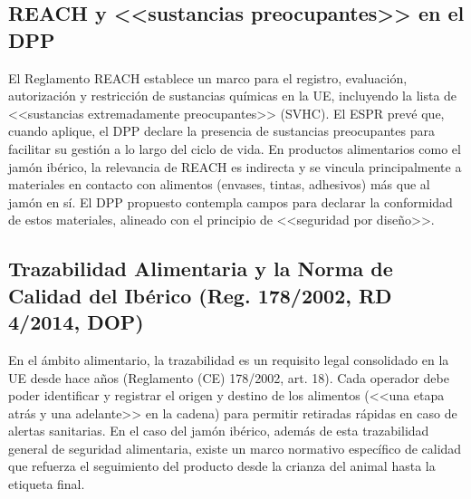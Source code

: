 \subsection{REACH y <<sustancias preocupantes>> en el DPP}\label{sec:marco-reach}
El Reglamento REACH establece un marco para el registro, evaluación, autorización y restricción de sustancias químicas en la UE, incluyendo la lista de <<sustancias extremadamente preocupantes>> (SVHC). %
El ESPR prevé que, cuando aplique, el DPP declare la presencia de sustancias preocupantes para facilitar su gestión a lo largo del ciclo de vida. %
En productos alimentarios como el jamón ibérico, la relevancia de REACH es indirecta y se vincula principalmente a materiales en contacto con alimentos (envases, tintas, adhesivos) más que al jamón en sí. El DPP propuesto contempla campos para declarar la conformidad de estos materiales, alineado con el principio de <<seguridad por diseño>>.

\subsection{Trazabilidad Alimentaria y la Norma de Calidad del Ibérico (Reg. 178/2002, RD 4/2014, DOP)}\label{sec:marco-calidad}
En el ámbito alimentario, la trazabilidad es un requisito legal consolidado en la UE desde hace años (Reglamento (CE) 178/2002, art. 18). Cada operador debe poder identificar y registrar el origen y destino de los alimentos (<<una etapa atrás y una adelante>> en la cadena) para permitir retiradas rápidas en caso de alertas sanitarias. En el caso del jamón ibérico, además de esta trazabilidad general de seguridad alimentaria, existe un marco normativo específico de calidad que refuerza el seguimiento del producto desde la crianza del animal hasta la etiqueta final.

